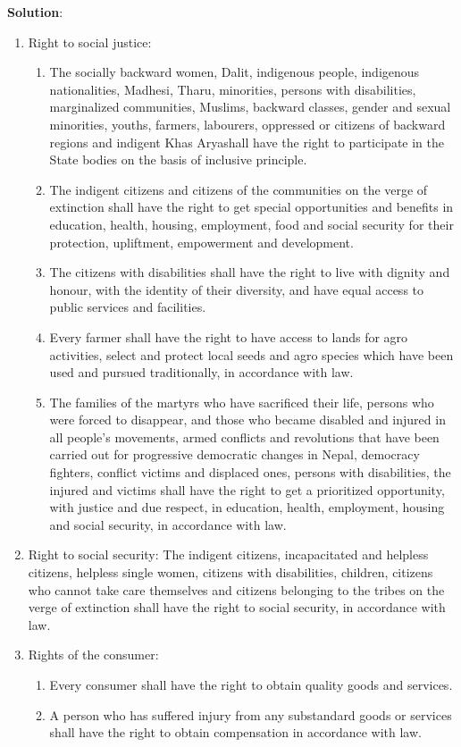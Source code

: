 \documentclass[
  openany]{book}
\newenvironment{solution}{ {\bfseries Solution}:}{}
\begin{document}
\begin{questions}
\begin{solution}
\begin{enumerate}
\item Right to social justice:
\begin{enumerate}
\item The socially backward women, Dalit, indigenous people, indigenous nationalities, Madhesi, Tharu, minorities, persons with disabilities, marginalized communities, Muslims, backward classes, gender and sexual minorities, youths, farmers, labourers, oppressed or citizens of backward regions and indigent Khas Aryashall have the right to participate in the State bodies on the basis of inclusive principle.
\item The indigent citizens and citizens of the communities on the verge of extinction shall have the right to get special opportunities and benefits in education, health, housing, employment, food and social security for their protection, upliftment, empowerment and development.
\item The citizens with disabilities shall have the right to live with dignity and honour, with the identity of their diversity, and have equal access to public services and facilities.
\item Every farmer shall have the right to have access to lands for agro activities, select and protect local seeds and agro species which have been used and pursued traditionally, in accordance with law.
\item The families of the martyrs who have sacrificed their life, persons who were forced to disappear, and those who became disabled and injured in all people's movements, armed conflicts and revolutions that have been carried out for progressive democratic changes in Nepal, democracy fighters, conflict victims and displaced ones, persons with disabilities, the injured and victims shall have the right to get a prioritized opportunity, with justice and due respect, in education, health, employment, housing and social security, in accordance with law.
\end{enumerate}

\item Right to social security: The indigent citizens, incapacitated and helpless citizens, helpless single women, citizens with disabilities, children, citizens who cannot take care themselves and citizens belonging to the tribes on the verge of extinction shall have the right to social security, in accordance with law.

\item Rights of the consumer:
\begin{enumerate}
\item Every consumer shall have the right to obtain quality goods and services.
\item A person who has suffered injury from any substandard goods or services shall have the right to obtain compensation in accordance with law.
\end{enumerate}


\end{enumerate}
\end{solution}
\end{questions}
\end{document}
